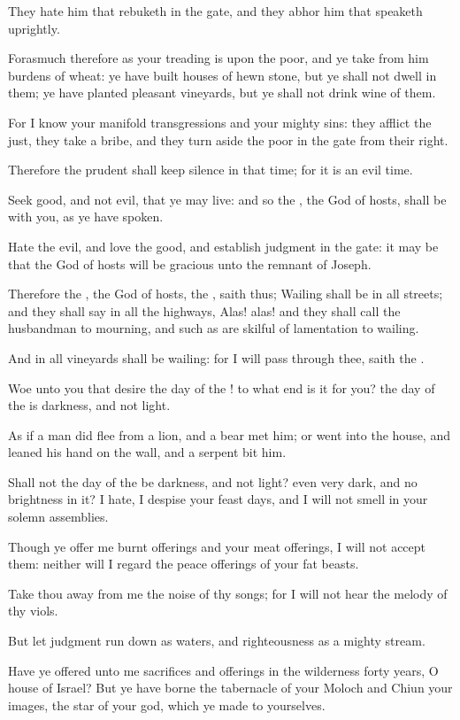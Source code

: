 \verse They hate him that rebuketh in the gate, and they abhor him that speaketh uprightly.

\verse Forasmuch therefore as your treading is upon the poor, and ye take from him burdens of wheat: ye have built houses of hewn stone, but ye shall not dwell in them; ye have planted pleasant vineyards, but ye shall not drink wine of them.

\verse For I know your manifold transgressions and your mighty sins: they afflict the just, they take a bribe, and they turn aside the poor in the gate from their right.

\verse Therefore the prudent shall keep silence in that time; for it is an evil time.

\verse Seek good, and not evil, that ye may live: and so the \LORD, the God of hosts, shall be with you, as ye have spoken.

\verse Hate the evil, and love the good, and establish judgment in the gate: it may be that the \LORD God of hosts will be gracious unto the remnant of Joseph.

\verse Therefore the \LORD, the God of hosts, the \LORD, saith thus; Wailing shall be in all streets; and they shall say in all the highways, Alas! alas!  and they shall call the husbandman to mourning, and such as are skilful of lamentation to wailing.

\verse And in all vineyards shall be wailing: for I will pass through thee, saith the \LORD.

\verse Woe unto you that desire the day of the \LORD! to what end is it for you? the day of the \LORD is darkness, and not light.

\verse As if a man did flee from a lion, and a bear met him; or went into the house, and leaned his hand on the wall, and a serpent bit him.

\verse Shall not the day of the \LORD be darkness, and not light? even very dark, and no brightness in it?  \verse I hate, I despise your feast days, and I will not smell in your solemn assemblies.

\verse Though ye offer me burnt offerings and your meat offerings, I will not accept them: neither will I regard the peace offerings of your fat beasts.

\verse Take thou away from me the noise of thy songs; for I will not hear the melody of thy viols.

\verse But let judgment run down as waters, and righteousness as a mighty stream.

\verse Have ye offered unto me sacrifices and offerings in the wilderness forty years, O house of Israel?  \verse But ye have borne the tabernacle of your Moloch and Chiun your images, the star of your god, which ye made to yourselves.

